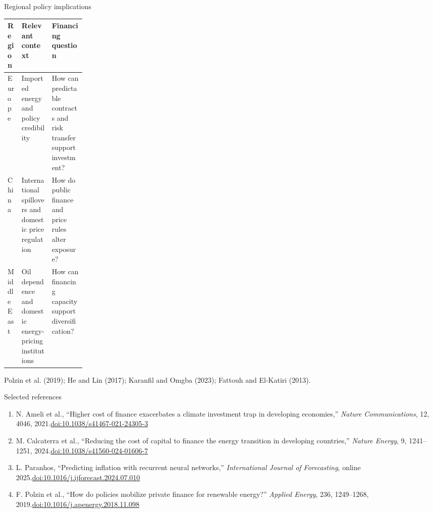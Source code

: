 \documentclass[11pt,aspectratio=169,xcolor={dvipsnames}]{beamer}
\newcommand{\source}[1]{\par\vfill{\fontsize{6.3}{7.5}\selectfont\color{PaperGray}\raggedright #1\par}}
\begin{document}
\begin{frame}{Regional policy implications}
\begin{tabularx}{\linewidth}{@{}p{0.18\linewidth}X X@{}}
\toprule
\textbf{Region} & \textbf{Relevant context} & \textbf{Financing question}\\
\midrule
Europe & Imported energy and policy credibility & How can predictable contracts and risk transfer support investment?\\[0.25cm]
China & International spillovers and domestic price regulation & How do public finance and price rules alter exposure?\\[0.25cm]
Middle East & Oil dependence and domestic energy-pricing institutions & How can financing capacity support diversification?\\
\bottomrule
\end{tabularx}
\source{Polzin et al. (2019); He and Lin (2017); Karanfil and Omgba (2023); Fattouh and El-Katiri (2013).}
\end{frame}

\begin{frame}{Selected references}
\footnotesize
\begin{enumerate}
\item N. Ameli et al., ``Higher cost of finance exacerbates a climate investment trap in developing economies,'' \textit{Nature Communications}, 12, 4046, 2021.\quad\href{https://doi.org/10.1038/s41467-021-24305-3}{doi:10.1038/s41467-021-24305-3}
\item M. Calcaterra et al., ``Reducing the cost of capital to finance the energy transition in developing countries,'' \textit{Nature Energy}, 9, 1241--1251, 2024.\quad\href{https://doi.org/10.1038/s41560-024-01606-7}{doi:10.1038/s41560-024-01606-7}
\item L. Paranhos, ``Predicting inflation with recurrent neural networks,'' \textit{International Journal of Forecasting}, online 2025.\quad\href{https://doi.org/10.1016/j.ijforecast.2024.07.010}{doi:10.1016/j.ijforecast.2024.07.010}
\item F. Polzin et al., ``How do policies mobilize private finance for renewable energy?'' \textit{Applied Energy}, 236, 1249--1268, 2019.\quad\href{https://doi.org/10.1016/j.apenergy.2018.11.098}{doi:10.1016/j.apenergy.2018.11.098}
\end{enumerate}

\end{frame}
\end{document}
